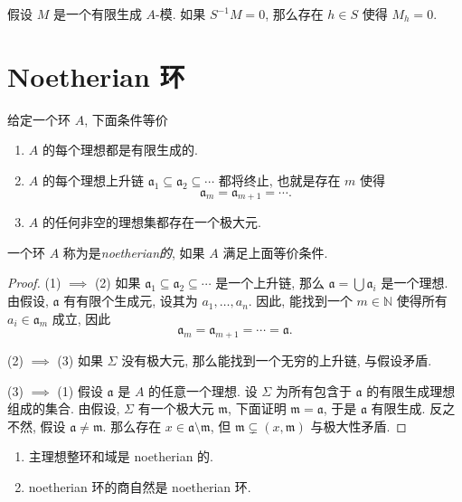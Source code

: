 \begin{proposition}
  假设 \( M \) 是一个有限生成 \( A \)-模.
  如果 \( S^{-1} M = 0 \), 那么存在 \( h \in S \) 使得 \( M_h = 0 \).
\end{proposition}

\section{Noetherian 环}

\begin{proposition}
  \label{proposition-Noetherian-ring-iff-condition}
  给定一个环 \( A \), 下面条件等价
  \begin{enumerate}
    \item \( A \) 的每个理想都是有限生成的.
    \item \( A \) 的每个理想上升链 \( \mathfrak{a}_1 \subseteq \mathfrak{a}_2 \subseteq
      \cdots \) 都将终止, 也就是存在 \( m \) 使得
      \[
        \mathfrak{a}_m = \mathfrak{a}_{m + 1} = \cdots.
      \]
    \item \( A \) 的任何非空的理想集都存在一个极大元.
  \end{enumerate}
  一个环 \( A \) 称为是\emph{noetherian的}, 如果 \( A \) 满足上面等价条件.
\end{proposition}
\begin{proof}
  (1) \( \implies \) (2)
  如果 \( \mathfrak{a}_1 \subseteq \mathfrak{a}_2 \subseteq \cdots \)
  是一个上升链, 那么 \( \mathfrak{a} = \bigcup \mathfrak{a}_i \) 是一个理想.
  由假设, \( \mathfrak{a} \) 有有限个生成元, 设其为 \( a_1, \ldots, a_n \).
  因此, 能找到一个 \( m \in \mathbb{N} \) 使得所有 \( a_i \in \mathfrak{a}_m \)
  成立, 因此
  \[
    \mathfrak{a}_m = \mathfrak{a}_{m + 1} = \cdots = \mathfrak{a}.
  \]

  (2) \( \implies \) (3) 如果 \( \Sigma \) 没有极大元,
  那么能找到一个无穷的上升链, 与假设矛盾.

  (3) \( \implies \) (1) 假设 \( \mathfrak{a} \) 是 \( A \) 的任意一个理想.
  设 \( \Sigma \) 为所有包含于 \( \mathfrak{a} \) 的有限生成理想组成的集合.
  由假设, \( \Sigma \) 有一个极大元 \( \mathfrak{m} \), 下面证明 \( \mathfrak{m}
  = \mathfrak{a} \), 于是 \( \mathfrak{a} \) 有限生成.
  反之不然, 假设 \( \mathfrak{a} \neq \mathfrak{m} \).
  那么存在 \( x \in \mathfrak{a} \setminus \mathfrak{m} \), 但 \( \mathfrak{m}
  \subsetneq \left( x, \mathfrak{m} \right) \) 与极大性矛盾.
\end{proof}

\begin{remark}
  \label{remark-noetherian-ring}
  \begin{enumerate}
    \item 主理想整环和域是 noetherian 的.
    \item noetherian 环的商自然是 noetherian 环.
  \end{enumerate}
\end{remark}

